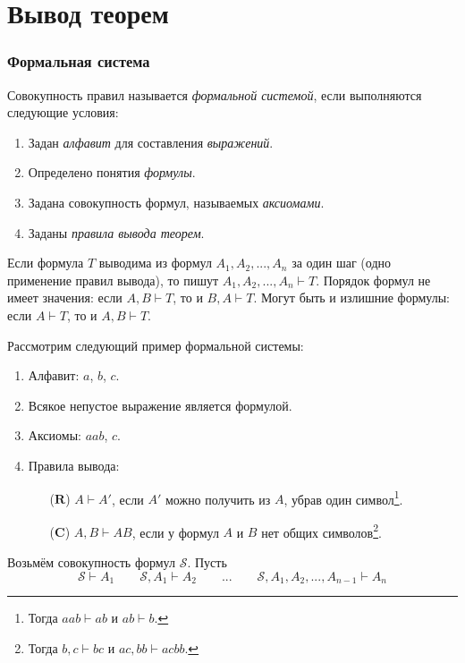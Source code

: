 \part{Вывод теорем}

\section{Формальная система}

Совокупность правил называется {\it формальной системой}, если выполняются следующие
условия:
\begin{enumerate}
	\item{}Задан {\it алфавит} для составления {\it выражений}.
	\item{}Определено понятия {\it формулы}.
	\item{}Задана совокупность формул, называемых {\it аксиомами}.
	\item{}Заданы {\it правила вывода теорем}.
\end{enumerate}

Если формула $T$ выводима из формул $A_1,A_2,...,A_{n}$ за один шаг (одно применение
правил вывода), то пишут $A_1,A_2,...,A_{n}\vdash T$. Порядок формул
не имеет значения: если $A,B\vdash T$, то и $B,A\vdash T$.
Могут быть и излишние формулы: если $A\vdash T$, то и $A,B\vdash T$.

\newcommand\ruleR{\mathbf{R}}
\newcommand\ruleC{\mathbf{C}}

Рассмотрим следующий пример формальной системы:
\begin{enumerate}
	\item{}Алфавит: $a$, $b$, $c$.
	\item{}Всякое непустое выражение является формулой.
	\item{}Аксиомы: $aab$, $c$.
	\item{}Правила вывода:
	\begin{enumerate}
		\item[($\ruleR$)]{}$A\vdash A'$, если $A'$ можно получить из $A$,
		убрав один символ\footnote{Тогда $aab\vdash ab$ и $ab\vdash b$.}.
		\item[($\ruleC$)]{}$A,B\vdash AB$, если у формул $A$ и $B$ нет
		общих символов\footnote{Тогда $b,c\vdash bc$ и $ac,bb\vdash acbb$.}.
	\end{enumerate}
\end{enumerate}

\newcommand\Sx{\mathcal S}
Возьмём совокупность формул $\Sx$. Пусть
\[
	\Sx\vdash A_1\qquad
	\Sx,A_1\vdash A_2\qquad...\qquad
	\Sx,A_1,A_2,...,A_{n-1}\vdash A_{n}
\]

